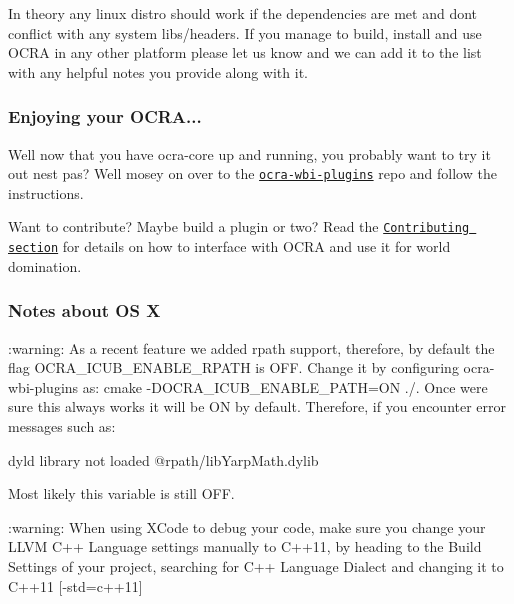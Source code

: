 In theory any linux distro should work if the dependencies are met and don\textquotesingle{}t conflict with any system libs/headers. If you manage to build, install and use O\+C\+RA in any other platform please let us know and we can add it to the list with any helpful notes you provide along with it.

\subsubsection*{Enjoying your O\+C\+RA...}

Well now that you have {\ttfamily ocra-\/core} up and running, you probably want to try it out n\textquotesingle{}est pas? Well mosey on over to the \href{https://github.com/ocra-recipes/ocra-wbi-plugins}{\tt ocra-\/wbi-\/plugins} repo and follow the instructions.

Want to contribute? Maybe build a plugin or two? Read the \href{#Contributing}{\tt Contributing section} for details on how to interface with O\+C\+RA and use it for world domination.

\subsubsection*{Notes about OS X}

\+:warning\+: As a recent feature we added rpath support, therefore, by default the flag {\ttfamily O\+C\+R\+A\+\_\+\+I\+C\+U\+B\+\_\+\+E\+N\+A\+B\+L\+E\+\_\+\+R\+P\+A\+TH} is {\ttfamily O\+FF}. Change it by configuring {\ttfamily ocra-\/wbi-\/plugins} as\+: {\ttfamily cmake -\/\+D\+O\+C\+R\+A\+\_\+\+I\+C\+U\+B\+\_\+\+E\+N\+A\+B\+L\+E\+\_\+\+P\+A\+TH=ON ./}. Once we\textquotesingle{}re sure this \textquotesingle{}\textquotesingle{}always\textquotesingle{}\textquotesingle{} works it will be {\ttfamily ON} by default. Therefore, if you encounter error messages such as\+:


\begin{DoxyCode}
dyld library not loaded @rpath/libYarpMath.dylib
\end{DoxyCode}


Most likely this variable is still {\ttfamily O\+FF}.

\+:warning\+: When using X\+Code to debug your code, make sure you change your L\+L\+VM C++ Language settings manually to C++11, by heading to the {\ttfamily Build Settings} of your project, searching for {\ttfamily C++ Language Dialect} and changing it to {\ttfamily C++11 \mbox{[}-\/std=c++11\mbox{]}}

